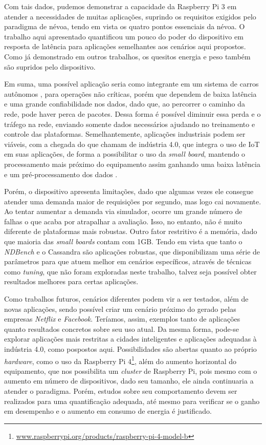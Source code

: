 \documentclass[12pt,english,brazil]{article}
\begin{document}
Com tais dados, pudemos demonstrar a capacidade da Raspberry Pi 3 em atender a necessidades de muitas aplicações, suprindo os requisitos exigidos pelo paradigma de névoa, tendo em vista os quatro pontos essenciais da névoa. O trabalho aqui apresentado quantificou um pouco do poder do dispositivo em resposta de latência para aplicações semelhantes aos cenários aqui propostos. Como já demonstrado em outros trabalhos, os quesitos energia e peso também são supridos pelo dispositivo.

Em suma, uma possível aplicação seria como integrante em um sistema de carros autônomos \cite{cars1}, para operações não críticas, porém que dependem de baixa latência e uma grande confiabilidade nos dados, dado que, ao percorrer o caminho da rede, pode haver perca de pacotes. Dessa forma é possível diminuir essa perda e o tráfego na rede, enviando somente dados necessários ajudando no treinamento e controle das plataformas. Semelhantemente, aplicações industriais podem ser viáveis, com a chegada do que chamam de indústria 4.0, que integra o uso de IoT em suas aplicações, de forma a possibilitar o uso da \textit{small board}, mantendo o processamento mais próximo do equipamento assim ganhando uma baixa latência e um pré-processamento dos dados \cite{industry4.0}. 

Porém, o dispositivo apresenta limitações, dado que algumas vezes ele consegue atender uma demanda maior de requisições por segundo, mas logo cai novamente. Ao tentar aumentar a demanda via simulador, ocorre um grande número de falhas o que acaba por atrapalhar a avaliação. Isso, no entanto, não é muito diferente de plataformas mais robustas. Outro fator restritivo é a memória, dado que maioria das \textit{small boards} contam com 1GB. Tendo em vista que tanto o \textit{NDBench} e o Cassandra são aplicações robustas, que disponibilizam uma série de parâmetros para que atuem melhor em cenários específicos, através de técnicas como \textit{tuning}, que não foram exploradas neste trabalho, talvez seja possível obter resultados melhores para certas aplicações.

Como trabalhos futuros, cenários diferentes podem vir a ser testados, além de novas aplicações, sendo possível criar um cenário próximo do gerado pelas empresas \textit{Netflix} e \textit{Facebook}. Teríamos, assim, exemplos tanto de aplicações quanto resultados concretos sobre seu uso atual. Da mesma forma, pode-se explorar aplicações mais restritas a cidades inteligentes e aplicações adequadas à indústria 4.0, como pospostos aqui. Possibilidades são abertas quanto ao próprio \textit{hardware}, como o uso da Raspberry Pi 4\footnote{\url{www.raspberrypi.org/products/raspberry-pi-4-model-b}}, além do aumento horizontal do equipamento, que nos possibilita um \textit{cluster} de Raspberry Pi, pois mesmo com o aumento em número de dispositivos, dado seu tamanho, ele ainda continuaria a atender o paradigma. Porém, estudos sobre seu comportamento devem ser realizados para uma quantificação adequada, até mesmo para verificar se o ganho em desempenho e o aumento em consumo de energia é justificado.



\end{document}
